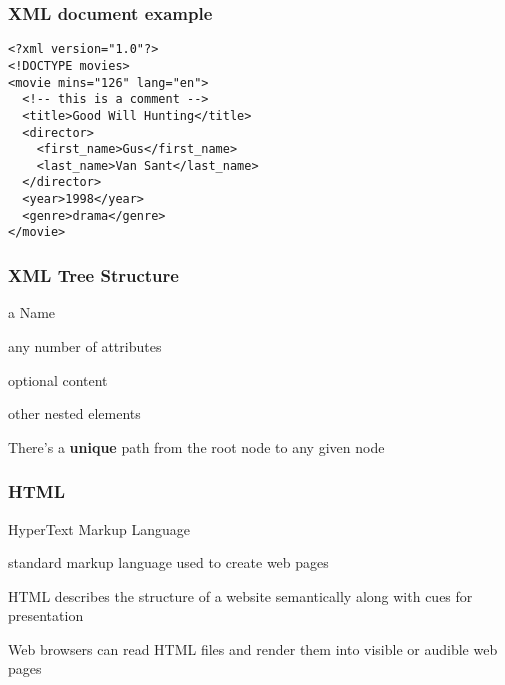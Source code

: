 \documentclass[12pt]{beamer}\usepackage[]{graphicx}\usepackage[]{color}
\begin{document}

\begin{frame}[fragile]
\frametitle{XML document example}

\begin{verbatim}
<?xml version="1.0"?>
<!DOCTYPE movies>
<movie mins="126" lang="en">
  <!-- this is a comment -->
  <title>Good Will Hunting</title>
  <director>
    <first_name>Gus</first_name>
    <last_name>Van Sant</last_name>
  </director>
  <year>1998</year>
  <genre>drama</genre>
</movie>
\end{verbatim}
\eb

\end{frame}


\begin{frame}
\frametitle{XML Tree Structure}

\bi
 \item a Name
 \item any number of attributes
 \item optional content
 \item other nested elements
\ei
\eb

There's a \textbf{unique} path from the root node to any given node 
\eb

\end{frame}


\begin{frame}
\begin{center}
\Huge{}
\end{center}
\end{frame}


\begin{frame}
\frametitle{HTML}

\bi
 \item HyperText Markup Language
 \item standard markup language used to create web pages
 \item HTML describes the structure of a website semantically along with cues for presentation
 \item Web browsers can read HTML files and render them into visible or audible web pages
\ei
\eb

\end{frame}
\end{document}
